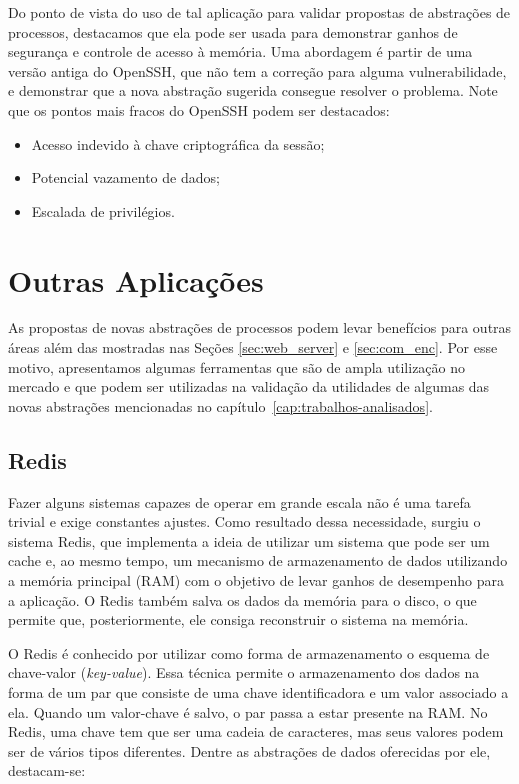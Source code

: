 Do ponto de vista do uso de tal aplicação para validar propostas de abstrações
de processos, destacamos que ela pode ser usada para demonstrar ganhos de
segurança e controle de acesso à memória. Uma abordagem é partir de uma versão
antiga do OpenSSH, que não tem a correção para alguma vulnerabilidade, e
demonstrar que a nova abstração sugerida consegue resolver o problema. Note que
os pontos mais fracos do OpenSSH podem ser destacados:

\begin{itemize}
  \item Acesso indevido à chave criptográfica da sessão;
  \item Potencial vazamento de dados;
  \item Escalada de privilégios.
\end{itemize}

\section{Outras Aplicações}

As propostas de novas abstrações de processos podem levar benefícios para
outras áreas além das mostradas nas Seções \ref{sec:web_server} e
\ref{sec:com_enc}. Por esse motivo, apresentamos algumas ferramentas que são de
ampla utilização no mercado e que podem ser utilizadas na validação da
utilidades de algumas das novas abstrações mencionadas no
capítulo~\ref{cap:trabalhos-analisados}.

\subsection{Redis}

Fazer alguns sistemas capazes de operar em grande escala não é uma tarefa trivial e exige constantes
ajustes. Como resultado dessa necessidade, surgiu o sistema Redis, que
implementa a ideia de utilizar um sistema que pode ser um cache e, ao mesmo tempo,
um mecanismo de armazenamento de dados utilizando a memória principal (RAM) com o objetivo
de levar ganhos de desempenho para a aplicação. O Redis também salva os dados
da memória para o disco, o que permite que, posteriormente, ele consiga
reconstruir o sistema na memória.

O Redis é conhecido por utilizar como forma de armazenamento o esquema de
chave-valor (\emph{key-value}). Essa técnica permite o armazenamento dos dados na
forma de um par que consiste de uma chave identificadora e um valor associado a
ela. Quando um valor-chave é salvo, o par passa a estar presente na
RAM. No Redis, uma chave tem que ser uma cadeia de caracteres, mas seus valores podem ser de
vários tipos diferentes. Dentre as abstrações de dados oferecidas por ele, destacam-se:

